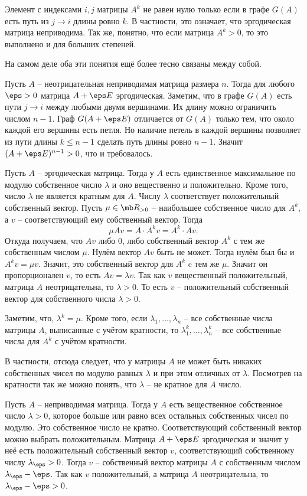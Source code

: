 \rm Элемент с индексами $i,j$ матрицы $A^k$ не равен нулю только если в графе $G(A)$ есть путь из $j\to i$ длины ровно $k$. В частности, это означает, что эргодическая матрица неприводима. Так  же, понятно, что если матрица $A^k>0$, то это выполнено и для больших степеней.
\erm

На самом деле оба эти понятия ещё более тесно связаны между собой. 

\lm Пусть $A$ -- неотрицательная неприводимая матрица размера $n$. Тогда для любого $\eps>0$  матрица $A+\eps E$ эргодическая.
\elm
\proof Заметим, что  в графе $G(A)$ есть пути $j\to i$ между любыми двумя вершинами. Их длину можно ограничить числом $n-1$. Граф $G(A+\eps E)$ отличается от $G(A)$ только тем, что около каждой его вершины есть петля. Но наличие петель в каждой вершины позволяет из пути длины $k\leq n-1$ сделать путь длины ровно $n-1$. Значит $(A+\eps E)^{n-1}>0$, что и требовалось.
\endproof



\thrm[Фробениус, 1912] Пусть $A$ -- эргодическая матрица. Тогда у $A$ есть единственное максимальное по модулю собственное число  $\lambda$ и оно вещественно и положительно. Кроме того, число $\lambda$ не является кратным для $A$. Числу  $\lambda$ соответствует положительный собственный вектор.
\ethrm
\proof Пусть $\mu\in \mb R_{>0}$ -- наибольшее собственное число для $A^k$, а $v$ -- соответствующий ему собственный вектор. Тогда 
$$\mu Av= A\cdot A^k v= A^k\cdot A v.$$
Откуда получаем, что $Av$ либо $0$, либо собственный вектор $A^k$ с тем же собственным числом $\mu$. Нулём вектор $Av$ быть не может. Тогда нулём был бы и $A^kv=\mu v$. Значит, это собственный вектор для $A^k$ c тем же $\mu$. Значит он пропорционален $v$, то есть $Av=\lambda v$. Так как $v$ вещественный положительный, матрица $A$ неотрицательна, то $\lambda>0$. То есть $v$ -- положительный собственный вектор для собственного числа $\lambda>0$. 

Заметим, что, $\lambda^k=\mu$. Кроме того, если $\lambda_1,\dots,\lambda_n$ -- все собственные числа матрицы $A$, выписанные с учётом кратности, то $\lambda_1^k,\dots,\lambda_n^k$ -- все собственные числа для $A^k$ с учётом кратности. 

В частности, отсюда следует, что у матрицы $A$ не может быть никаких собственных чисел по модулю равных  $\lambda$ и при этом отличных от $\lambda$. Посмотрев на кратности так же можно понять, что $\lambda$ -- не кратное для $A$ число. 
\endproof

\crl Пусть $A$ -- неприводимая матрица. Тогда у $A$ есть вещественное собственное число $\lambda>0$, которое больше или равно всех остальных собственных чисел по модулю. Это собственное   число не кратно. Соответствующий собственный вектор можно выбрать положительным. 
\ecrl
\proof Матрица $A+\eps E$ эргодическая и значит у неё есть положительный собственный вектор $v$, соответствующий собственному числу $\lambda_{\eps}>0$. Тогда $v$ -- собственный вектор матрицы $A$ с собственным числом $\lambda_{\eps}-\eps$. Так как $v$ положительный, а матрица $A$ неотрицательна, то $\lambda_{\eps}-\eps>0$.

